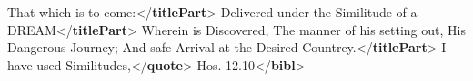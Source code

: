 \begin{shaded}
\hspace*{1em}That which is to come:{</\textbf{titlePart}>}\mbox{}\newline 
\hspace*{1em}Delivered under the Similitude of a\mbox{}\newline 
\hspace*{1em}DREAM{</\textbf{titlePart}>}\mbox{}\newline 
\hspace*{1em}Wherein is Discovered,\mbox{}\newline 
\hspace*{1em}The manner of his setting out,\mbox{}\newline 
\hspace*{1em}His Dangerous Journey; And safe\mbox{}\newline 
\hspace*{1em}Arrival at the Desired Countrey.{</\textbf{titlePart}>}\mbox{}\newline 
{}\mbox{}\newline 
{}\mbox{}\newline 
\hspace*{1em}\mbox{}\newline 
\hspace*{1em}\hspace*{1em}I have used Similitudes,{</\textbf{quote}>}\mbox{}\newline 
\hspace*{1em}\hspace*{1em}Hos. 12.10{</\textbf{bibl}>}\mbox{}\newline 

\end{shaded}
